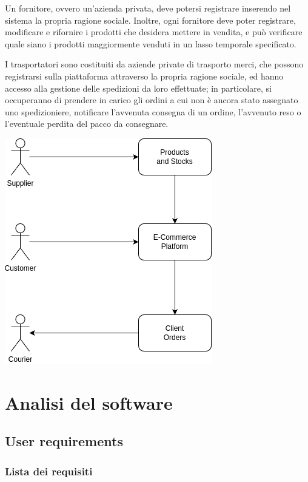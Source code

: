 \documentclass[12pt]{report}
\begin{document}
    Un fornitore, ovvero un'azienda privata, deve potersi registrare inserendo nel sistema la propria ragione sociale. Inoltre, ogni fornitore deve poter registrare, modificare e rifornire i prodotti che desidera mettere in vendita, e può verificare quale siano i prodotti maggiormente venduti in un lasso temporale specificato.

    I trasportatori sono costituiti da aziende private di trasporto merci, che possono registrarsi sulla piattaforma attraverso la propria ragione sociale, ed hanno accesso alla gestione delle spedizioni da loro effettuate; in particolare, si occuperanno di prendere in carico gli ordini a cui non è ancora stato assegnato uno spedizioniere, notificare l'avvenuta consegna di un ordine, l'avvenuto reso o l'eventuale perdita del pacco da consegnare.

    \quad
    
    \begin{center}
        \includegraphics[scale=0.55]{images/Operating Environment.png}
    \end{center}

    \chapter{Analisi del software}

    \section{User requirements}

    \subsection{Lista dei requisiti}
   
\end{document}
